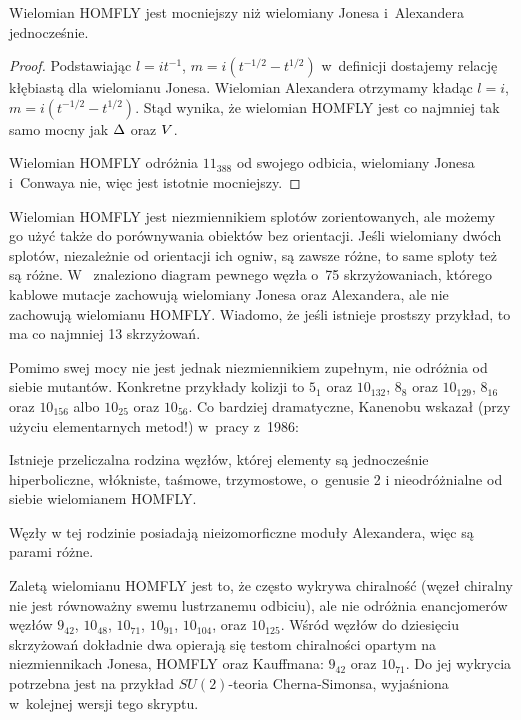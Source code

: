 \begin{proposition}
    Wielomian HOMFLY jest mocniejszy niż wielomiany Jonesa i~Alexandera jednocześnie.
\end{proposition}

\begin{proof}
    Podstawiając $l = it^{-1}$, $m = i(t^{-1/2} - t^{1/2})$ w~definicji dostajemy relację kłębiastą dla wielomianu Jonesa.
    Wielomian Alexandera otrzymamy kładąc $l = i$, $m = i(t^{-1/2} - t^{1/2})$.
    Stąd wynika, że wielomian HOMFLY jest co najmniej tak samo mocny jak $\Delta$ oraz $V$.

    Wielomian HOMFLY odróżnia $11_{388}$ od swojego odbicia, wielomiany Jonesa i~Conwaya nie, więc jest istotnie mocniejszy.
\end{proof}

Wielomian HOMFLY jest niezmiennikiem splotów zorientowanych, ale możemy go użyć także do porównywania obiektów bez orientacji.
Jeśli wielomiany dwóch splotów, niezależnie od orientacji ich ogniw, są zawsze różne, to same sploty też są różne.
W~\cite{dunfield10} znaleziono diagram pewnego węzła o~75 skrzyżowaniach, którego kablowe mutacje zachowują wielomiany Jonesa oraz Alexandera, ale nie zachowują wielomianu HOMFLY.
Wiadomo, że jeśli istnieje prostszy przykład, to ma co najmniej 13 skrzyżowań.

Pomimo swej mocy nie jest jednak niezmiennikiem zupełnym, nie odróżnia od siebie mutantów.
Konkretne przykłady kolizji to $5_1$ oraz $10_{132}$, $8_{8}$ oraz $10_{129}$, $8_{16}$ oraz $10_{156}$ albo $10_{25}$ oraz $10_{56}$.
Co bardziej dramatyczne, Kanenobu wskazał (przy użyciu elementarnych metod!) w~pracy \cite{kanenobu86} z~1986:

\begin{proposition}
    Istnieje przeliczalna rodzina węzłów, której elementy są jednocześnie hiperboliczne, włókniste, taśmowe, trzymostowe, o~genusie 2 i nieodróżnialne od siebie wielomianem HOMFLY.
\end{proposition}

Węzły w tej rodzinie posiadają nieizomorficzne moduły Alexandera, więc są parami różne.

Zaletą wielomianu HOMFLY jest to, że często wykrywa chiralność (węzeł chiralny nie jest równoważny swemu lustrzanemu odbiciu), ale nie odróżnia enancjomerów węzłów $9_{42}$, $10_{48}$, $10_{71}$, $10_{91}$, $10_{104}$, oraz $10_{125}$.
Wśród węzłów do dziesięciu skrzyżowań dokładnie dwa opierają się testom chiralności opartym na niezmiennikach Jonesa, HOMFLY oraz Kauffmana: $9_{42}$ oraz $10_{71}$.
Do jej wykrycia potrzebna jest na przykład $SU(2)$-teoria Cherna-Simonsa, wyjaśniona w~kolejnej wersji tego skryptu.

